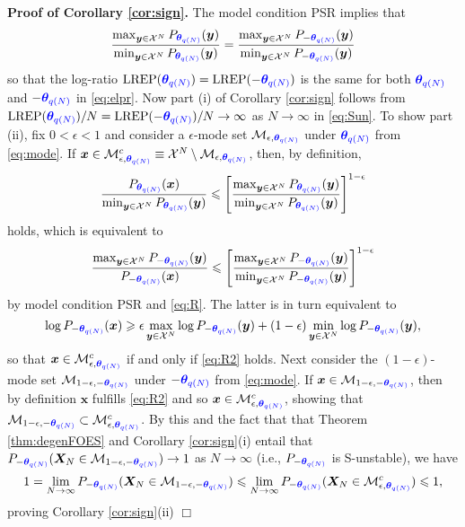 \documentclass[numbib]{imamat}
\theoremstyle{theorem}
\theoremstyle{lemma}
\theoremstyle{example}
\theoremstyle{corollary}
\theoremstyle{definition}
\theoremstyle{remark}
\theoremstyle{approximation}
\theoremstyle{scheme}
\newcommand{\REP}{\mathrm{LREP}}
\newcommand{\thetaidx}{q(N)}
\newcommand{\thetaN}{\boldsymbol \theta_{\thetaidx}}
\newcommand{\ak}[1]{{\color{blue} #1}}
\begin{document}
\textbf{Proof of Corollary \ref{cor:sign}.} The model condition PSR implies that
\begin{equation}
\label{eq:R}
\frac{\max_{\boldsymbol y \in \mathcal{X}^N}P_{\ak{\thetaN}}(\boldsymbol y)  }{\min_{\boldsymbol y \in \mathcal{X}^N}P_{\ak{\thetaN}}(\boldsymbol y) } = \frac{\max_{\boldsymbol y \in \mathcal{X}^N}P_{-\ak{\thetaN}}(\boldsymbol y) }{\min_{\boldsymbol y \in \mathcal{X}^N}P_{-\ak{\thetaN}}(\boldsymbol y) }
\end{equation}
so that the log-ratio \(\REP(\ak{\thetaN})=\REP(-\ak{\thetaN})\) is the same for both \(\ak{\thetaN}\) and \(-\ak{\thetaN}\) in \eqref{eq:elpr}. Now part (i) of Corollary \ref{cor:sign} follows from \(\REP(\ak{\thetaN})/N=\REP(-\ak{\thetaN})/N\to \infty\) as \(N\to \infty\) in \eqref{eq:Sun}. To show part (ii), fix \(0 < \epsilon < 1\) and consider a \(\epsilon\)-mode set \(\mathcal{M}_{\epsilon, \ak{\thetaN}}\) under \(\ak{\thetaN}\) from \eqref{eq:mode}. If \(\boldsymbol x \in \mathcal{M}_{\epsilon, \ak{\thetaN}}^c \equiv \mathcal{X}^N \setminus \mathcal{M}_{\epsilon, \ak{\thetaN}}\), then, by definition,
\[
\frac{P_{\ak{\thetaN}}(\boldsymbol x)}{\min_{\boldsymbol y \in \mathcal{X}^N}P_{ \ak{\thetaN}}(\boldsymbol y)} \leq \left[\frac{\max_{\boldsymbol y \in \mathcal{X}^N}P_{\ak{\thetaN}}(\boldsymbol y)  }{\min_{\boldsymbol y \in \mathcal{X}^N}P_{\ak{\thetaN}}(\boldsymbol y) } \right]^{1-\epsilon}
\]
holds, which is equivalent to
\[
\frac{\max_{\boldsymbol y \in \mathcal{X}^N}P_{-\ak{\thetaN}}(\boldsymbol y)}{P_{-\ak{\thetaN}}(\boldsymbol x)} \leq
\left[\frac{\max_{\boldsymbol y \in \mathcal{X}^N}P_{-\ak{\thetaN}}(\boldsymbol y)  }{\min_{\boldsymbol y \in \mathcal{X}^N}P_{-\ak{\thetaN}}(\boldsymbol y) } \right]^{1-\epsilon}
\]
by model condition PSR and \eqref{eq:R}. The latter is in turn equivalent to
\begin{equation}
\label{eq:R2}
\log P_{-\ak{\thetaN}}(\boldsymbol x) \geq \epsilon \max\limits_{\boldsymbol y \in \mathcal{X}^N} \log  P_{-\ak{\thetaN}}(\boldsymbol y) + (1-\epsilon)\min\limits_{\boldsymbol y \in \mathcal{X}^N} \log P_{-\ak{\thetaN}}(\boldsymbol y),
\end{equation}
so that \(\boldsymbol x \in \mathcal{M}_{\epsilon, \ak{\thetaN}}^c\) if and only if \eqref{eq:R2} holds. Next consider the \((1-\epsilon)\)-mode set \(\mathcal{M}_{1-\epsilon, -\ak{\thetaN}}\) under \(-\ak{\thetaN}\) from \eqref{eq:mode}. If \(\boldsymbol x \in\mathcal{M}_{1-\epsilon, -\ak{\thetaN}}\), then by definition \(\boldsymbol x\) fulfills \eqref{eq:R2} and so \(\boldsymbol x \in \mathcal{M}_{\epsilon, \ak{\thetaN}}^c\), showing that \(\mathcal{M}_{1-\epsilon, -\ak{\thetaN}} \subset \mathcal{M}_{\epsilon, \ak{\thetaN}}^c\). By this and the fact that that Theorem \ref{thm:degenFOES} and Corollary \ref{cor:sign}(i) entail that \(P_{-\ak{\thetaN}}(\boldsymbol X_N \in \mathcal{M}_{1-\epsilon, -\ak{\thetaN}})\to 1\) as \(N\to \infty\) (i.e., \(P_{-\ak{\thetaN}}\) is S-unstable), we have
\[
1  = \lim_{N\to \infty} P_{-\ak{\thetaN}}(\boldsymbol X_N \in \mathcal{M}_{1-\epsilon, -\ak{\thetaN}}) \leq \lim_{N\to \infty} P_{-\ak{\thetaN}}(\boldsymbol X_N \in \mathcal{M}_{\epsilon, \ak{\thetaN}}^c ) \leq 1,
\]
proving Corollary \ref{cor:sign}(ii) \hfill \(\Box\)
\end{document}
